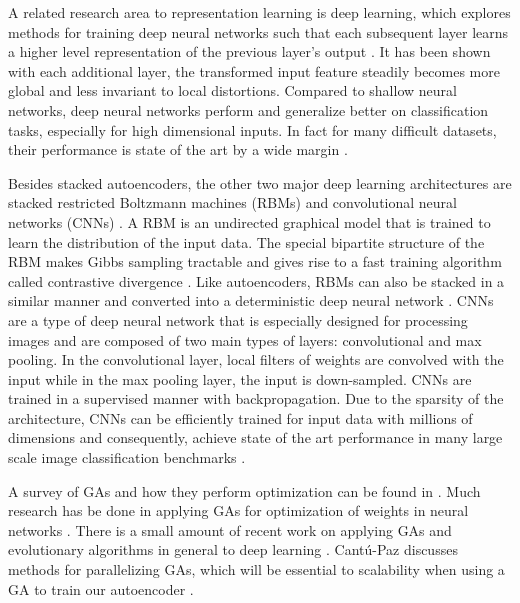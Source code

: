 A related research area to representation learning is deep learning, which explores methods for training deep neural networks such that each subsequent layer learns a higher level representation of the previous layer's output \cite{bengio2009learning}. It has been shown with each additional layer, the transformed input feature steadily becomes more global and less invariant to local distortions. Compared to shallow neural networks, deep neural networks perform and generalize better on classification tasks, especially for high dimensional inputs. In fact for many difficult datasets, their performance is state of the art by a wide margin \cite{schmidhuber2014deep}. 

Besides stacked autoencoders, the other two major deep learning architectures are stacked restricted Boltzmann machines (RBMs) \cite{hinton2006fast} and convolutional neural networks (CNNs) \cite{lecun1995convolutional}. A RBM is an undirected graphical model that is trained to learn the distribution of the input data. The special bipartite structure of the RBM makes Gibbs sampling tractable and gives rise to a fast training algorithm called contrastive divergence \cite{hinton2006fast,hinton2006learning}. Like autoencoders, RBMs can also be stacked in a similar manner and converted into a deterministic deep neural network \cite{hinton2006reducing}. CNNs are a type of deep neural network that is especially designed for processing images and are composed of two main types of layers: convolutional and max pooling. In the convolutional layer, local filters of weights are convolved with the input while in the max pooling layer, the input is down-sampled. CNNs are trained in a supervised manner with backpropagation. Due to the sparsity of the architecture, CNNs can be efficiently trained for input data with millions of dimensions and consequently, achieve state of the art performance in many large scale image classification benchmarks \cite{ciresan2011committee,krizhevsky2012imagenet,goodfellow2013multi}.

A survey of GAs and how they perform optimization can be found in \cite{srinivas1994genetic}. Much research has be done in applying GAs for optimization of weights in neural networks \cite{gomez2006efficient,floreano2008neuroevolution}. There is a small amount of recent work on applying GAs and evolutionary algorithms in general to deep learning \cite{koutnik2014evolving,david2014genetic}. Cant{\'u}-Paz discusses methods for parallelizing GAs, which will be essential to scalability when using a GA to train our autoencoder \cite{cantu1998survey}.

